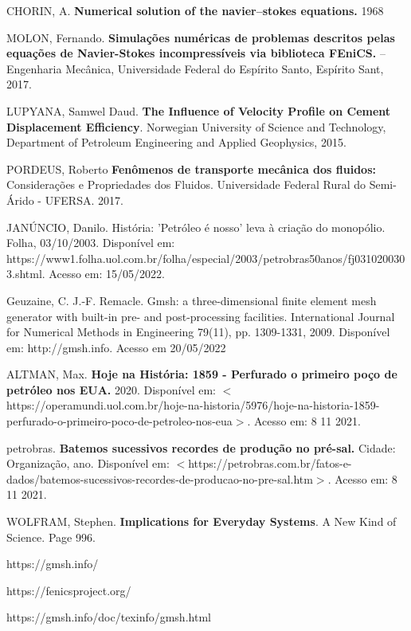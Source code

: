 CHORIN, A. {\bf Numerical solution of the navier–stokes equations.} 1968


MOLON, Fernando. {\bf Simulações numéricas de problemas descritos pelas equações de Navier-Stokes incompressíveis via biblioteca FEniCS.} – Engenharia Mecânica, Universidade Federal do Espírito Santo, Espírito Sant, 2017.

LUPYANA, Samwel Daud. {\bf The Influence of Velocity Profile on Cement Displacement Efficiency}. Norwegian University of Science and Technology, Department of Petroleum Engineering and Applied Geophysics, 2015.

PORDEUS, Roberto {\bf Fenômenos de transporte mecânica dos fluidos:} Considerações e Propriedades dos Fluidos. Universidade Federal Rural do Semi-Árido - UFERSA. 2017.


JANÚNCIO, Danilo. História: 'Petróleo é nosso' leva à criação do monopólio. Folha, 03/10/2003. Disponível em: https://www1.folha.uol.com.br/folha/especial/2003/petrobras50anos/fj0310200303.shtml. Acesso em: 15/05/2022.

\bibitem{}Geuzaine, C. J.-F. Remacle. Gmsh: a three-dimensional finite element mesh generator with built-in pre- and post-processing facilities. International Journal for Numerical Methods in Engineering 79(11), pp. 1309-1331, 2009. Disponível em:  http://gmsh.info. Acesso em 20/05/2022

ALTMAN, Max. {\bf Hoje na História: 1859 - Perfurado o primeiro poço de petróleo nos EUA.} 2020. Disponível em: $<$https://operamundi.uol.com.br/hoje-na-historia/5976/hoje-na-historia-1859-perfurado-o-primeiro-poco-de-petroleo-nos-eua$>$. Acesso em: 8 11 2021.

petrobras. {\bf Batemos sucessivos recordes de produção no pré-sal.} Cidade: Organização, ano. Disponível em: $<$https://petrobras.com.br/fatos-e-dados/batemos-sucessivos-recordes-de-producao-no-pre-sal.htm$>$. Acesso em: 8 11 2021.

WOLFRAM, Stephen. {\bf  Implications for Everyday Systems}. A New Kind of Science. Page 996.

 https://gmsh.info/

 https://fenicsproject.org/

 https://gmsh.info/doc/texinfo/gmsh.html

